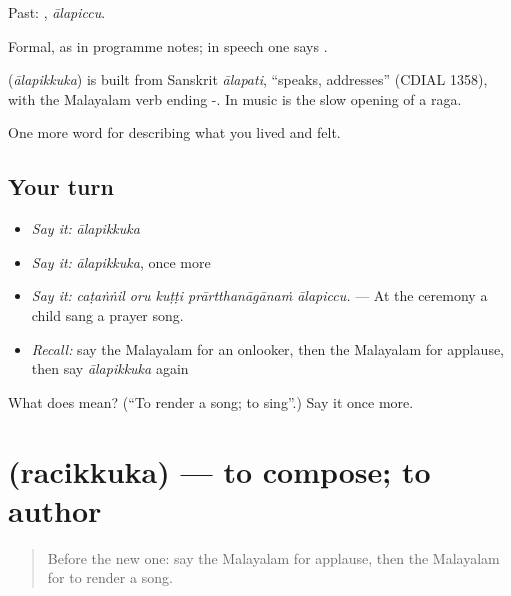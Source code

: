 Past: , \emph{ālapiccu}.

Formal, as in programme notes; in speech one says .

\begin{cousinweb}
\textbf{} (\emph{ālapikkuka}) is built from Sanskrit \emph{ālapati}, \textquotedblleft{}speaks, addresses\textquotedblright{} (CDIAL 1358), with the Malayalam verb ending -. In music  is the slow opening of a raga.
\end{cousinweb}

\begin{grammarlens}[title={What you've built}]
One more word for describing what you lived and felt.
\end{grammarlens}

\subsection*{Your turn}
\begin{itemize}
\raggedright
  \item \emph{Say it:} \emph{ālapikkuka}
  \item \emph{Say it:} \emph{ālapikkuka}, once more
  \item \emph{Say it:} \emph{caṭaṅṅil oru kuṭṭi prārtthanāgānaṁ ālapiccu.} — At the ceremony a child sang a prayer song.
  \item \emph{Recall:} say the Malayalam for an onlooker, then the Malayalam for applause, then say \emph{ālapikkuka} again
\end{itemize}

\begin{tcolorbox}[breakable,colback=teal!4,colframe=teal!35!black,title={Before you move on}]
What does  mean? (\textquotedblleft{}To render a song; to sing\textquotedblright{}.) Say it once more.
\end{tcolorbox}
\section[\texorpdfstring{\ml{രചിക്കുക} (racikkuka)}{രചിക്കുക (racikkuka)}]{ (racikkuka) — to compose; to author}

\label{lesson:ML-C564-racikkuka}



\begin{quote}
Before the new one: say the Malayalam for applause, then the Malayalam for to render a song.
\end{quote}

